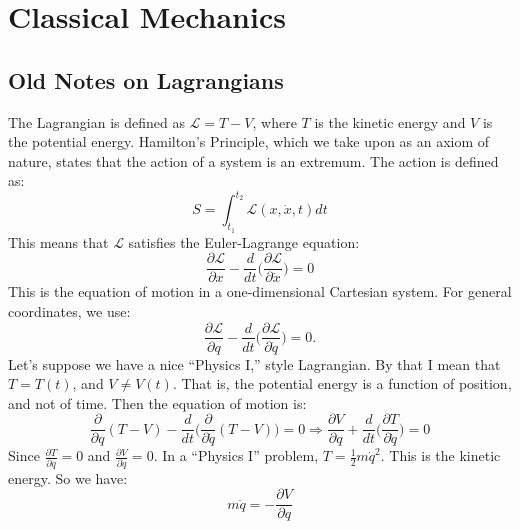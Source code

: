 \documentclass[crop=false,class=article,oneside]{standalone}
\begin{document}
    \ifx\ifsub\undefined
        \section*{Classical Mechanics}
        \setcounter{section}{2}
    \fi
    \subsection{Old Notes on Lagrangians}
    The Lagrangian is defined as $\mathcal{L}=T-V$,
    where $T$ is the kinetic energy and $V$ is the
    potential energy. Hamilton's Principle,
    which we take upon as an axiom of nature,
    states that the action of a system is an extremum.
    The action is defined as:
    \begin{equation*}
        S=\int_{t_1}^{t_2}\mathcal{L}(x,\dot{x},t)dt
    \end{equation*}This means that $\mathcal{L}$
    satisfies the Euler-Lagrange equation:
    \begin{equation*} 
        \frac{\partial \mathcal{L}}{\partial{x}}
        -
        \frac{d}{dt}\big(
            \frac{\partial\mathcal{L}}{\partial\dot{x}}
        \big)
        =0
    \end{equation*}
    This is the equation of motion in a one-dimensional
    Cartesian system. For general coordinates, we use:
    \begin{equation*}
        \frac{\partial\mathcal{L}}{\partial q}
        -\frac{d}{dt}\big(
            \frac{\partial\mathcal{L}}{\partial\dot{q}}
        \big)
        =0.
    \end{equation*}
    Let's suppose we have a nice ``Physics I,'' style Lagrangian.
    By that I mean that $T = T(t)$, and $V \ne V(t)$.
    That is, the potential energy is a function of position,
    and not of time. Then the equation of motion is:
    \begin{equation*}
        \frac{\partial}{\partial q}(T-V)-\frac{d}{dt}
        \big(\frac{\partial}{\partial\dot{q}}(T-V)\big)=0
        \Rightarrow
        \frac{\partial{V}}{\partial{q}}
        +\frac{d}{dt}\big(
            \frac{\partial{T}}{\partial\dot{q}}
        \big)
        =0
    \end{equation*}
    Since $\frac{\partial{T}}{\partial{q}}=0$
    and $\frac{\partial{V}}{\partial\dot{q}}=0$.
    In a ``Physics I'' problem, $T=\frac{1}{2}m\dot{q}^2$.
    This is the kinetic energy. So we have:
    \begin{equation}
    \nonumber m\ddot{q} = -\frac{\partial V}{\partial q}
    \end{equation}
\end{document}
